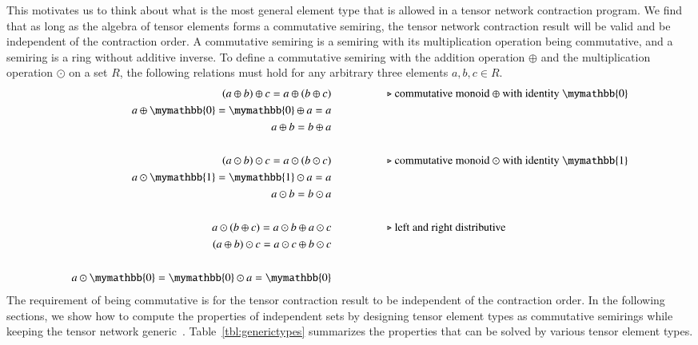 \documentclass[onefignum, onetabnum]{siamart190516}
\newcommand{\<}{\langle}
\renewcommand{\>}{\rangle}
\begin{document}
This motivates us to think about what is the most general element type that is allowed in a tensor network contraction program.
We find that as long as the algebra of tensor elements forms a commutative semiring, the tensor network contraction result will be valid and be independent of the contraction order.
A commutative semiring is a semiring with its multiplication operation being commutative, and a semiring is a ring without additive inverse.
To define a commutative semiring with the addition operation $\oplus$ and the multiplication operation $\odot$ on a set $R$, the following relations must hold for any arbitrary three elements $a, b, c \in R$.
\begin{align*}
(a \oplus b) \oplus c = a \oplus (b \oplus c) & \hspace{5em}\text{$\triangleright$ commutative monoid $\oplus$ with identity $\mymathbb{0}$}\\
a \oplus \mymathbb{0} = \mymathbb{0} \oplus a = a &\\
a \oplus b = b \oplus a &\\
&\\
(a \odot b) \odot c = a \odot (b \odot c)  &   \hspace{5em}\text{$\triangleright$ commutative monoid $\odot$ with identity $\mymathbb{1}$}\\
a \odot  \mymathbb{1} =  \mymathbb{1} \odot a = a &\\
a \odot b = b \odot a &\\
&\\
a \odot (b\oplus c) = a\odot b \oplus a\odot c  &  \hspace{5em}\text{$\triangleright$ left and right distributive}\\
(a\oplus b) \odot c = a\odot c \oplus b\odot c &\\
&\\
a \odot \mymathbb{0} = \mymathbb{0} \odot a = \mymathbb{0}
\end{align*}
The requirement of being commutative is for the tensor contraction result to be independent of the contraction order.
In the following sections, we show how to compute the properties of independent sets by designing tensor element types as commutative semirings while keeping the tensor network generic~\cite{Stepanov2014}.
Table~\ref{tbl:generictypes} summarizes the properties that can be solved by various tensor element types. 
\end{document}
